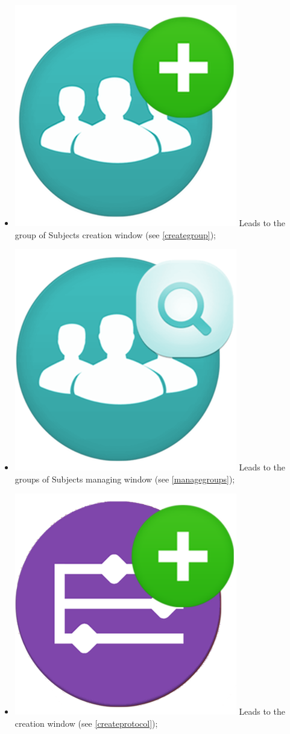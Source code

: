 \begin{itemize}
\item \includegraphics[scale=0.08]{./Images/new_Group} Leads to the group of Subjects\g{} creation window (see \ref{creategroup});
\item \includegraphics[scale=0.08]{./Images/manage_Groups} Leads to the groups of Subjects\g{} managing window (see \ref{managegroups});
\item \includegraphics[scale=0.08]{./Images/new_Protocol} Leads to the \protocol{} creation window (see \ref{createprotocol});

\end{itemize}
